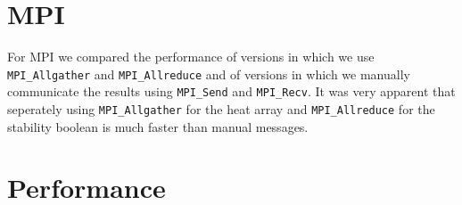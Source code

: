 \documentclass[a4paper]{article}
\begin{document}
\section{MPI}
For MPI we compared the performance of versions in which  we use \texttt{MPI\_Allgather}
and \texttt{MPI\_Allreduce} and of versions in which we manually communicate the results using \texttt{MPI\_Send} and \texttt{MPI\_Recv}. It was very apparent that seperately using \texttt{MPI\_Allgather} for the heat array and \texttt{MPI\_Allreduce} for the stability boolean is much faster than manual messages.

\section{Performance}
\end{document}
